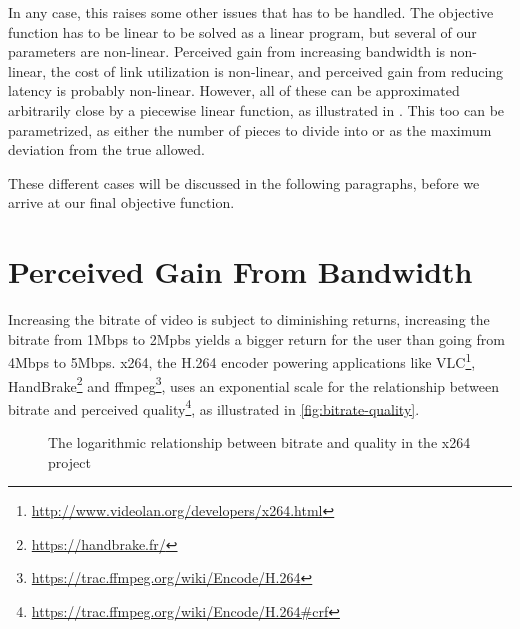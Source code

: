 In any case, this raises some other issues that has to be handled. The objective function has to be linear to be solved as a linear program, but several of our parameters are non-linear. Perceived gain from increasing bandwidth is non-linear, the cost of link utilization is non-linear, and perceived gain from reducing latency is probably non-linear. However, all of these can be approximated arbitrarily close by a piecewise linear function, as illustrated in . This too can be parametrized, as either the number of pieces to divide into or as the maximum deviation from the true allowed.

These different cases will be discussed in the following paragraphs, before we arrive at our final objective function.


\section{Perceived Gain From Bandwidth}

Increasing the bitrate of video is subject to diminishing returns, increasing the bitrate from 1Mbps to 2Mpbs yields a bigger return for the user than going from 4Mbps to 5Mbps. x264, the H.264 encoder powering applications like VLC\footnote{\url{http://www.videolan.org/developers/x264.html}}, HandBrake\footnote{\url{https://handbrake.fr/}} and ffmpeg\footnote{\url{https://trac.ffmpeg.org/wiki/Encode/H.264}}, uses an exponential scale for the relationship between bitrate and perceived quality\footnote{\url{https://trac.ffmpeg.org/wiki/Encode/H.264\#crf}}, as illustrated in \autoref{fig:bitrate-quality}.

\begin{figure}
    \centering


    \caption{The logarithmic relationship between bitrate and quality in the x264 project}
    \label{fig:bitrate-quality}
\end{figure}


